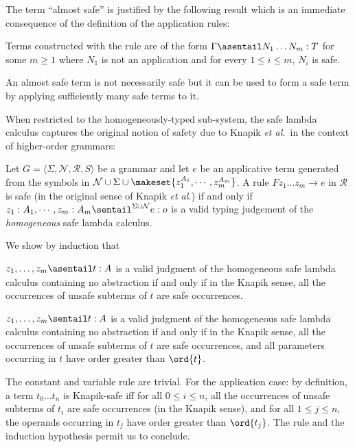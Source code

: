 The term ``almost safe'' is justified by the following result which is an immediate consequence of the definition of the application rules:
\begin{lemma}
\label{lem:almostsafe_is_appplicative_safe} Terms constructed with the
rule  are of the form $\Gamma \asentail N_1
\ldots N_m : T$ for some $m\geq 1$ where $N_1$ is not an application and
for every $1 \leq i\leq m$, $N_i$ is safe.
\end{lemma}
An almost safe term is not necessarily safe but it can be used to form a safe term by applying sufficiently many safe terms to it.
\bigskip

When restricted to the homogeneously-typed sub-system, the safe
lambda calculus captures the original notion of safety due to Knapik
\emph{et al.}~in the context of higher-order grammars:

\begin{proposition}
\label{prop:safegram_safelmd}
 Let $G = \langle \Sigma, \mathcal{N}, \mathcal{R},
  S \rangle$ be a grammar and let $e$ be an applicative term generated
  from the symbols in $\mathcal{N} \cup \Sigma \cup \makeset{z_1^{A_1},
    \cdots, z_m^{A_m}}$.  A rule $F z_1 \ldots z_m \rightarrow e$ in
  $\mathcal{R}$ is safe (in the original sense of Knapik \emph{et al.}) if and only if $ z_1 : A_1, \cdots, z_m : A_m
  \sentail^{\Sigma \cup \mathcal{N}} e : o$ is a valid typing judgement
  of the \emph{homogeneous} safe lambda calculus.
\end{proposition}
\proof
We show by induction that \begin{asparaenum}
\item  $z_1,\ldots, z_m \asentail t:A$ is a valid judgment of the homogeneous safe lambda calculus containing no abstraction if and only if in the Knapik sense, all the occurrences of unsafe subterms of $t$ are safe occurrences.
\item $z_1,\ldots, z_m \sentail t:A$ is a valid judgment of the homogeneous safe lambda calculus containing no abstraction if and only if in the Knapik sense, all the occurrences of unsafe subterms of $t$ are safe occurrences, and all parameters occurring in $t$ have order greater than $\ord{t}$. \end{asparaenum}
The constant and variable rule are trivial. For the application case: by definition, a term $t_0 \ldots t_n$ is Knapik-safe iff for all $0\leq i \leq n$, all the occurrences of unsafe subterms of $t_i$ are safe occurrences (in the Knapik sense), and for all $1\leq j \leq n$, the operands occurring in $t_j$ have order greater than $\ord{t_j}$. The  rule and the induction hypothesis permit us to conclude.

